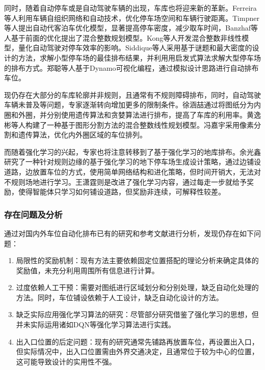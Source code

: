 同时，随着自动停车或是自动驾驶车辆的出现，车库也将迎来新的革新。Ferreira\cite{ferreira2014self}等人利用车辆自组织网络和自动技术，优化停车场空间和车辆行驶距离。Timpner\cite{timpner2015k}等人提出自动代客泊车优化模型，显著提高停车密度，减少取车时间，Banzhaf\cite{banzhaf2017high}等人基于前面的优化提出了混合整数规划模型。Kong\cite{kong2018capacity}等人开发混合整数非线性模型，量化自动驾驶对停车效率的影响。Siddique\cite{siddique2021puzzle}等人采用基于谜题和最大密度的设计的方法，求解小型停车场的最佳排布结果，并利用用启发式算法求解大型停车场的排布方式。郑聪\cite{TMJZ202104021}等人基于Dynamo可视化编程，通过模拟设计思路进行自动排布车位。

现仍存在大部分的车库轮廓并非规则，且通常有不规则障碍排布，同时，自动驾驶车辆未普及等问题，专家逐渐转向增加更多的限制条件。徐涵喆\cite{1020726891.nh}通过将图纸分为内圈和外圈，并分别使用遗传算法和贪婪算法进行排布，提高了车库的利用率。黄逸彬等人\cite{BJYD202004002}构建了一种基于图形分割方法的混合整数线性规划模型。冯嘉宇\cite{1022674189.nh}采用像素分割和遗传算法，优化内外圈区域的车位排列。

而随着强化学习的兴起，专家也将注意转移到了基于强化学习的地库排布。余光鑫\cite{1020332216.nh}研究了一种针对规则边缘的基于强化学习的地下停车场生成设计策略，通过边铺设道路，边放置车位的方式，使用简单网络结构和进化策略，但时间开销大，无法对不规则场地进行学习。王潇霆\cite{1022674189.nh}则是改进了强化学习内容，通过每走一步就给予奖励，使得智能体只学习如何铺设道路，但奖励非连续，可解释性较差。

\subsubsection{存在问题及分析}
通过对国内外车位自动化排布已有的研究和参考文献进行分析，发现仍存在如下问题：
\begin{enumerate}
  \item 局限性的奖励机制：现有方法主要依赖固定位置搭配的理论分析来确定具体的奖励值，未充分利用周围所有信息进行计算。  
  \item 过度依赖人工干预：需要对图纸进行区域划分和分别处理，缺乏自动化处理的方法。同时，车位铺设依赖于人工设计，缺乏自动化设计的方法。  
  \item 缺乏实际应用强化学习算法的研究：尽管部分研究借鉴了强化学习的思想，但并未实际运用诸如DQN等强化学习算法进行实践。
  \item 出入口位置的后定问题：现有的研究通常先铺路再放置车位，再设置出入口，但实际情况中，出入口位置需由外界交通决定，且通常位于较为中心的位置，这可能导致设计的实用性不强。
  \end{enumerate}

